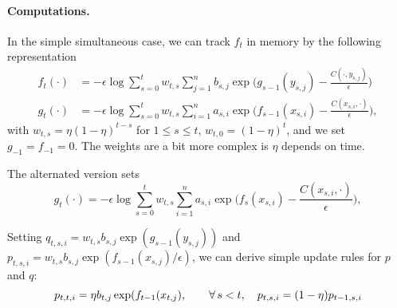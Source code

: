 \documentclass[a4paper, 10pt]{article}
\begin{document}
\paragraph{Computations.} In the simple simultaneous case, we can track $f_t$ in memory by the following representation
\begin{align}
    f_t(\cdot) &= - \epsilon \log \sum_{s=0}^t w_{t,s} \sum_{j=1}^n b_{s, j} 
    \exp\Big(g_{s-1}(y_{s,j}) - \frac{C(\cdot, y_{s, j})}{\epsilon}\Big) \\
    g_t(\cdot) &= - \epsilon \log \sum_{s=0}^t w_{t,s} \sum_{i=1}^n a_{s, i} 
    \exp\Big(f_{s-1}(x_{s, i}) - \frac{C(x_{s,i}, \cdot)}{\epsilon}\Big),
\end{align}
with $w_{t,s} = \eta (1-\eta)^{t-s}$ for $1 \leq s \leq t$, $w_{t,0} =
(1-\eta)^{t}$, and we set $g_{-1} = f_{-1} = 0$. The weights are a bit more
complex is $\eta$ depends on time.

The alternated version sets
\begin{equation}
    g_t(\cdot) = - \epsilon \log \sum_{s=0}^t w_{t,s} \sum_{i=1}^n a_{s, i} 
    \exp\Big(f_{s}(x_{s, i}) - \frac{C(x_{s,i}, \cdot)}{\epsilon}\Big),
\end{equation}

Setting $q_{t,s,i} = w_{t,s} b_{s, j} \exp(g_{s-1}(y_{s,
j}))$ and $p_{t,s,i} = w_{t,s} b_{s, j} \exp(f_{s-1}(x_{s, j})/ \epsilon)$, we can derive
simple update rules for $p$ and $q$:
\begin{equation}
    p_{t,t, i} = \eta b_{t,j} \exp(f_{t-1}(x_{t, j}),
    \qquad \forall \, s < t,\quad p_{t,s, i} = (1- \eta) p_{t-1,s, i}
\end{equation}
\printbibliography
\end{document}
